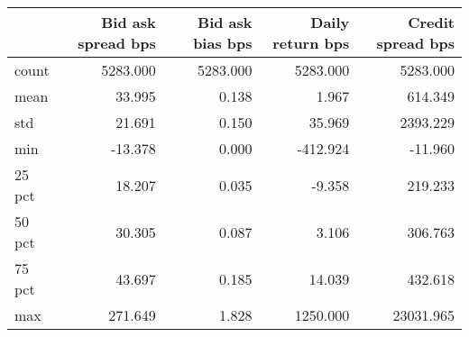 \begin{tabular}{lrrrr}
\toprule
 & Bid ask spread bps & Bid ask bias bps & Daily return bps & Credit spread bps \\
\midrule
count & 5283.000 & 5283.000 & 5283.000 & 5283.000 \\
mean & 33.995 & 0.138 & 1.967 & 614.349 \\
std & 21.691 & 0.150 & 35.969 & 2393.229 \\
min & -13.378 & 0.000 & -412.924 & -11.960 \\
25 pct & 18.207 & 0.035 & -9.358 & 219.233 \\
50 pct & 30.305 & 0.087 & 3.106 & 306.763 \\
75 pct & 43.697 & 0.185 & 14.039 & 432.618 \\
max & 271.649 & 1.828 & 1250.000 & 23031.965 \\
\bottomrule
\end{tabular}
